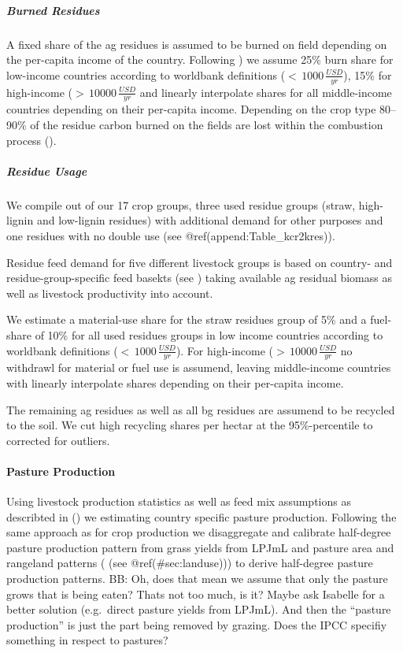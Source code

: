 \documentclass[gc, manuscript]{copernicus}
\begin{document}
\subparagraph{Burned Residues}

A fixed share of the ag residues is assumed to be burned on field
depending on the per-capita income of the country. Following
\citep{smil1999}) we assume 25\% burn share for low-income countries
according to worldbank definitions (\(<\,1000\,\tfrac{USD}{yr}\)), 15\%
for high-income (\(>\,10000\,\tfrac{USD}{yr}\) and linearly interpolate
shares for all middle-income countries depending on their per-capita
income. Depending on the crop type 80--90\% of the residue carbon burned
on the fields are lost within the combustion process
(\citep{ipcc_2006_2006}).

\subparagraph{Residue Usage}

We compile out of our 17 crop groups, three used residue groups (straw,
high-lignin and low-lignin residues) with additional demand for other
purposes and one residues with no double use (see
@ref(append:Table\_kcr2kres)).

Residue feed demand for five different livestock groups is based on
country- and residue-group-specific feed basekts (see \citep{weindl})
taking available ag residual biomass as well as livestock productivity
into account.

We estimate a material-use share for the straw residues group of 5\% and
a fuel-share of 10\% for all used residues groups in low income
countries according to worldbank definitions
(\(<\,1000\,\tfrac{USD}{yr}\)). For high-income
(\(>\,10000\,\tfrac{USD}{yr}\) no withdrawl for material or fuel use is
assumend, leaving middle-income countries with linearly interpolate
shares depending on their per-capita income.

The remaining ag residues as well as all bg residues are assumend to be
recycled to the soil. We cut high recycling shares per hectar at the
95\%-percentile to corrected for outliers.

\paragraph{Pasture Production}

Using livestock production statistics as well as feed mix assumptions as
describted in (\citep{weindl}) we estimating country specific pasture
production. Following the same approach as for crop production we
disaggregate and calibrate half-degree pasture production pattern from
grass yields from LPJmL and pasture area and rangeland patterns ( (see
@ref(\#sec:landuse))) to derive half-degree pasture production patterns.
BB: Oh, does that mean we assume that only the pasture grows that is
being eaten? Thats not too much, is it? Maybe ask Isabelle for a better
solution (e.g.~direct pasture yields from LPJmL). And then the ``pasture
production'' is just the part being removed by grazing. Does the IPCC
specifiy something in respect to pastures?
\end{document}
